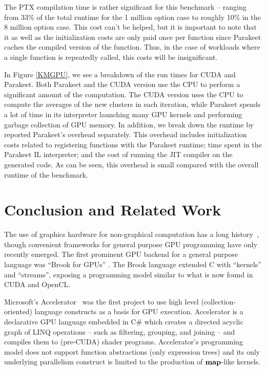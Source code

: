 \documentclass[10pt,twocolumn]{article}
\begin{document}
The PTX compilation time is rather significant for this benchmark -- ranging from 33\% of the total runtime for the 1 million option case to roughly 10\% in the 8 million option case.  This cost can't be helped, but it is important to note that it as well as the initialization costs are only paid once per function since Parakeet caches the compiled version of the function.  Thus, in the case of workloads where a single function is repeatedly called, this costs will be insignificant.

In Figure \ref{KMGPU}, we see a breakdown of the run times for CUDA and Parakeet.  Both Parakeet and the CUDA version use the CPU to perform a significant amount of the computation.  The CUDA version uses the CPU to compute the averages of the new clusters in each iteration, while Parakeet spends a lot of time in its interpreter launching many GPU kernels and performing garbage collection of GPU memory.  In addition, we break down the runtime by reported Parakeet's overhead separately.  This overhead includes initialization costs related to registering functions with the Parakeet runtime; time spent in the Parakeet IL interpreter; and the cost of running the JIT compiler on the generated code.  As can be seen, this overhead is small compared with the overall runtime of the benchmark.

\section{Conclusion and Related Work}
\label{Conclusion}
The use of graphics hardware for non-graphical computation has a  long history~\cite{Leng90}, though convenient frameworks for general purpose GPU programming have only recently emerged. The first prominent GPU backend for a general purpose language was ``Brook for GPUs'' \cite{Buck04}. The Brook language extended C with ``kernels'' and ``streams'', exposing a programming model similar to what is now found in CUDA and OpenCL.

Microsoft's Accelerator~\cite{Tard06} was the first project to use high level (collection-oriented) language constructs as a basis for GPU execution. Accelerator is a declarative GPU language embedded in C\# which creates a directed acyclic graph of LINQ operations -- such as filtering, grouping, and joining -- and compiles them to (pre-CUDA) shader programs. Accelerator's programming model does not support function abstractions (only expression trees) and its only underlying parallelism construct is limited to the production of $\mbox{\textbf{map}}$-like kernels.
\end{document}
